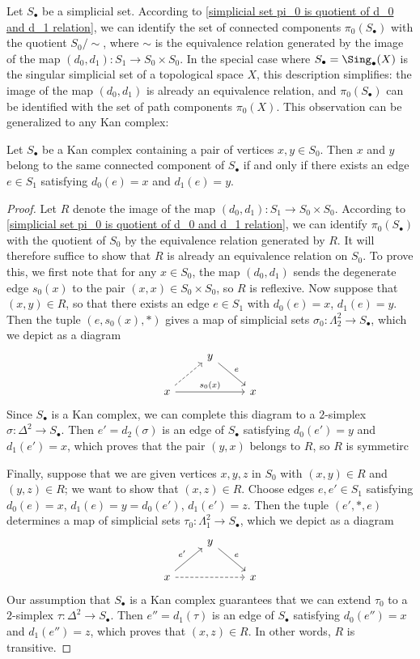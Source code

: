 Let $S_\bullet$ be a simplicial set. According to \cref{simplicial set pi_0 is quotient of d_0 and d_1 relation}, we can identify the set of connected components $\pi_0(S_\bullet)$ with the quotient $S_0/\sim$, where $\sim$ is the equivalence relation generated by the image of the map $(d_0,d_1):S_1\to S_0\times S_0$. In the special case where $S_\bullet=\Sing_\bullet(X)$ is the singular simplicial set of a topological space $X$, this description simplifies: the image of the map $(d_0,d_1)$ is already an equivalence relation, and $\pi_0(S_\bullet)$ can be identified with the set of path components $\pi_0(X)$. This observation can be generalized to any Kan complex:
\begin{proposition}\label{simplicial set Kan same component iff connected by edge}
Let $S_\bullet$ be a Kan complex containing a pair of vertices $x,y\in S_0$. Then $x$ and $y$ belong to the same connected component of $S_\bullet$ if and only if there exists an edge $e\in S_1$ satisfying $d_0(e)=x$ and $d_1(e)=y$.
\end{proposition}
\begin{proof}
Let $R$ denote the image of the map $(d_0,d_1):S_1\to S_0\times S_0$. According to \cref{simplicial set pi_0 is quotient of d_0 and d_1 relation}, we can identify $\pi_0(S_\bullet)$ with the quotient of $S_0$ by the equivalence relation generated by $R$. It will therefore suffice to show that $R$ is already an equivalence relation on $S_0$. To prove this, we first note that for any $x\in S_0$, the map $(d_0,d_1)$ sends the degenerate edge $s_0(x)$ to the pair $(x,x)\in S_0\times S_0$, so $R$ is reflexive. Now suppose that $(x,y)\in R$, so that there exists an edge $e\in S_1$ with $d_0(e)=x$, $d_1(e)=y$. Then the tuple $(e,s_0(x),\ast)$ gives a map of simplicial sets $\sigma_0:\Lambda^2_2\to S_\bullet$, which we depict as a diagram
\[\begin{tikzcd}
&y\ar[rd,"e"]&\\
x\ar[ru,dashed]\ar[rr,"s_0(x)"]&&x
\end{tikzcd}\]
Since $S_\bullet$ is a Kan complex, we can complete this diagram to a $2$-simplex $\sigma:\Delta^2\to S_\bullet$. Then $e'=d_2(\sigma)$ is an edge of $S_\bullet$ satisfying $d_0(e')=y$ and $d_1(e')=x$, which proves that the pair $(y,x)$ belongs to $R$, so $R$ is symmetirc\par
Finally, suppose that we are given vertices $x,y,z$ in $S_0$ with $(x,y)\in R$ and $(y,z)\in R$; we want to show that $(x,z)\in R$. Choose edges $e,e'\in S_1$ satisfying $d_0(e)=x$, $d_1(e)=y=d_0(e')$, $d_1(e')=z$. Then the tuple $(e',\ast,e)$ determines a map of simplicial sets $\tau_0:\Lambda^2_1\to S_\bullet$, which we depict as a diagram
\[\begin{tikzcd}
&y\ar[rd,"e"]&\\
x\ar[ru,"e'"]\ar[rr,dashed]&&x
\end{tikzcd}\]
Our assumption that $S_\bullet$ is a Kan complex guarantees that we can extend $\tau_0$ to a $2$-simplex $\tau:\Delta^2\to S_\bullet$. Then $e''=d_1(\tau)$ is an edge of $S_\bullet$ satisfying $d_0(e'')=x$ and $d_1(e'')=z$, which proves that $(x,z)\in R$. In other words, $R$ is transitive.
\end{proof}
